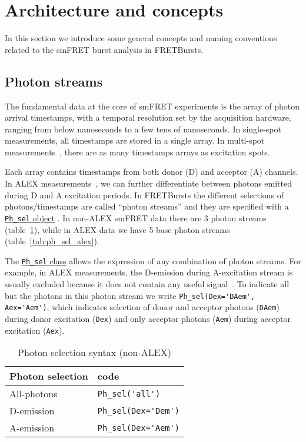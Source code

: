 \section{Architecture and concepts}
\label{sec:concepts}

In this section we introduce some general concepts and naming conventions related
to the smFRET burst analysis in FRETBursts.

\subsection{Photon streams}
\label{sec:ph_streams}

The fundamental data at the core of smFRET experiments is the array of photon
arrival timestamps, with a temporal resolution set by the acquisition hardware,
ranging from below nanoseconds to a few tens of nanoseconds.
In single-spot
measurements, all timestamps are stored in a single array. In multi-spot
measurements~\cite{Ingargiola_2013}, there are as many timestamps arrays
as excitation spots.

Each array contains timestamps from both donor (D) and acceptor (A) channels.
In ALEX measurements~\cite{Lee_2005}, we can further differentiate between
photons emitted during D and A excitation periods. In FRETBursts the different
selections of photons/timestamps are called ``photon streams'' and they are
specified with a
\href{http://fretbursts.readthedocs.org/en/latest/ph_sel.html}{\texttt{Ph\_sel}
object} . In non-ALEX smFRET data there are 3 photon streams
(table~\ref{tab:ph_sel_smfret}), while in ALEX data we have 5 base photon
streams (table~\ref{tab:ph_sel_alex}).

The
\href{http://fretbursts.readthedocs.org/en/latest/ph_sel.html}{\texttt{Ph\_sel}
class} allows the expression of any combination of photon streams.
For example, in ALEX measurements, the D-emission during A-excitation stream is
usually excluded because it does not contain any useful signal~\cite{Lee_2005}.
To indicate all but the photons in this photon stream we write
\verb|Ph_sel(Dex='DAem', Aex='Aem')|, which indicates selection of donor
and acceptor photons (\verb|DAem|) during donor excitation (\verb|Dex|) and only acceptor
photons (\verb|Aem|) during acceptor excitation (\verb|Aex|).

\begin{table}
\begin{tabular}{l|l}
  Photon selection  & code \\
  \hline
  All-photons       & \verb|Ph_sel('all')|\\
  D-emission    & \verb|Ph_sel(Dex='Dem')|\\
  A-emission & \verb|Ph_sel(Dex='Aem')|\\
\end{tabular}
\caption{\label{tab:ph_sel_smfret}Photon selection syntax (non-ALEX)}
\end{table}


